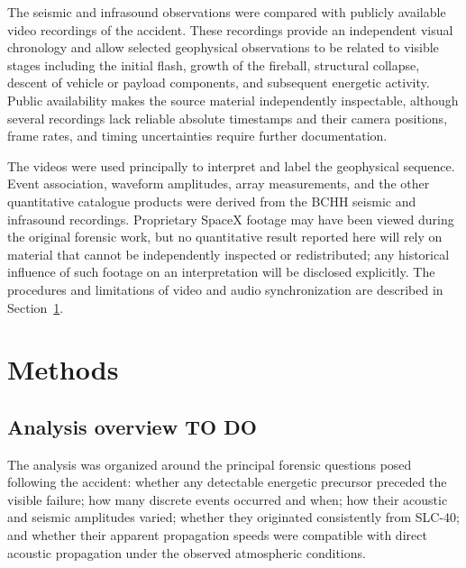 \documentclass[]{seismica}
\begin{document}
The seismic and infrasound observations were compared with publicly available
video recordings of the accident. These recordings provide an independent
visual chronology and allow selected geophysical observations to be related to
visible stages including the initial flash, growth of the fireball, structural
collapse, descent of vehicle or payload components, and subsequent energetic
activity. Public availability makes the source material independently
inspectable, although several recordings lack reliable absolute timestamps and
their camera positions, frame rates, and timing uncertainties require further
documentation.

The videos were used principally to interpret and label the geophysical
sequence. Event association, waveform amplitudes, array measurements, and the
other quantitative catalogue products were derived from the BCHH seismic and
infrasound recordings. Proprietary SpaceX footage may have been viewed during
the original forensic work, but no quantitative result reported here will rely
on material that cannot be independently inspected or redistributed; any
historical influence of such footage on an interpretation will be disclosed
explicitly. The procedures and limitations of video and audio
synchronization are described in Section~\ref{sec:methods}.


\section{Methods}
\label{sec:methods}

\subsection{Analysis overview TO DO}

The analysis was organized around the principal forensic questions posed
following the accident: whether any detectable energetic precursor preceded
the visible failure; how many discrete events occurred and when; how their
acoustic and seismic amplitudes varied; whether they originated consistently
from SLC-40; and whether their apparent propagation speeds were compatible with
direct acoustic propagation under the observed atmospheric conditions.
\end{document}

